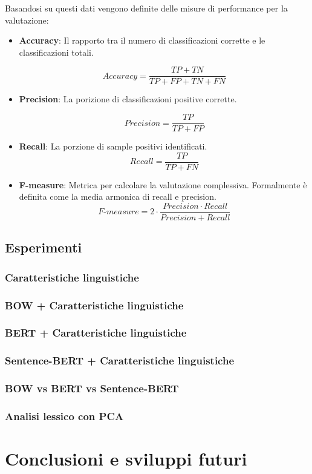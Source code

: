 \documentclass[oneside]{book}
\begin{document}
Basandosi su questi dati vengono definite delle misure di performance per la valutazione:

\begin{itemize}
	\item \textbf{Accuracy}: Il rapporto tra il numero di classificazioni corrette e le classificazioni totali.
	
	$$Accuracy = \frac{TP + TN}{TP + FP + TN + FN} $$
	
	\item \textbf{Precision}: La porizione di classificazioni positive corrette.
	
	$$Precision = \frac{TP}{TP + FP} $$
		
	\item \textbf{Recall}: La porzione di sample positivi identificati.
	$$Recall = \frac{TP}{TP + FN} $$
	
	
	\item \textbf{F-measure}: Metrica per calcolare la valutazione complessiva. Formalmente è definita come la media armonica di recall e precision.
	$$F\text{-}measure =  2 \cdot \frac{Precision \cdot Recall}{Precision + Recall} $$
	
\end{itemize}

\section{Esperimenti}

\subsection{Caratteristiche linguistiche}
\subsection{BOW + Caratteristiche linguistiche}
\subsection{BERT + Caratteristiche linguistiche}
\subsection{Sentence-BERT + Caratteristiche linguistiche}
\subsection{BOW vs BERT vs Sentence-BERT}
\subsection{Analisi lessico con PCA}


\chapter{Conclusioni e sviluppi futuri}
\end{document}
